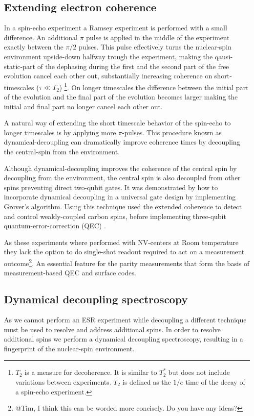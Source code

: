 \subsection{Extending electron coherence}
In a spin-echo experiment a Ramsey experiment is performed with a small difference. An additional $\pi$ pulse is applied in the middle of the experiment exactly between the $\pi/2$ pulses. This pulse effectively turns the nuclear-spin environment upside-down halfway trough the experiment, making the qausi-static-part of the dephasing during the first and the second part of the free evolution cancel each other out, substantially increasing coherence on short-timescales ($\tau \ll T_2 $)
\footnote{ $T_2$ is a measure for decoherence. It is similar to $T_2^*$ but does not include variations between experiments. $T_2$ is defined as the $1/e$ time of the decay of a spin-echo experiment.}.
On longer timescales the difference between the initial part of the evolution and the final part of the evolution becomes larger making the initial and final part no longer cancel each other out.

A natural way of extending the short timescale behavior of the spin-echo to longer timescales is by applying more $\pi$-pulses. This procedure known as dynamical-decoupling can dramatically improve coherence times by decoupling the central-spin from the environment\citep{Lange2010Universal}.

Although dynamical-decoupling improves the coherence of the central spin by decoupling from the environment, the central spin is also decoupled from other spins preventing direct two-qubit gates. It was demonstrated by \citet{Sar2012DecoherenceProtected} how to incorporate dynamical decoupling in a universal gate design by implementing Grover's algorithm.
Using this technique \citet{Taminiau2012Detection} used the extended coherence to detect and control weakly-coupled carbon spins, before implementing three-qubit quantum-error-correction (QEC) \citep{Taminiau2014Universal}.

As these experiments where performed with NV-centers at Room temperature they lack the option to do single-shot readout required to act on a measurement outcome\footnote{@Tim, I think this can be worded more concisely. Do you have any ideas?}. An essential feature for the parity measurements that form the basis of measurement-based QEC and surface codes.

\subsection{Dynamical decoupling spectroscopy}
As we cannot perform an ESR experiment while decoupling a different technique must be used to resolve and address additional spins.
In order to resolve additional spins we perform a dynamical decoupling spectroscopy, resulting in a fingerprint of the nuclear-spin environment\citep{Taminiau2012Detection}.

